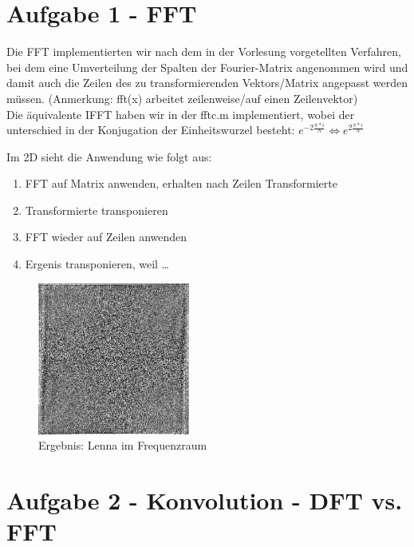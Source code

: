 



\newcommand{\nr}{2}
\lstset{language=matlab}


\section*{Aufgabe 1 - FFT}
Die FFT implementierten wir nach dem in der Vorlesung vorgetellten Verfahren,
bei dem eine Umverteilung der Spalten der Fourier-Matrix angenommen wird und
damit auch die Zeilen des zu transformierenden Vektors/Matrix angepasst werden
m\"ussen. (Anmerkung: fft(x) arbeitet zeilenweise/auf einen Zeilenvektor)\\


Die \"aquivalente IFFT haben wir in der fftc.m implementiert, wobei der
unterschied in der Konjugation der Einheitswurzel besteht: 
$e^{-2\frac{\pi*i}{N}} \Leftrightarrow e^{2\frac{\pi*i}{N}} $

Im 2D sieht die Anwendung wie folgt aus: 
\begin{enumerate}
\item FFT auf Matrix anwenden, erhalten nach Zeilen Transformierte
\item Transformierte transponieren
\item FFT wieder auf Zeilen anwenden
\item Ergenis transponieren, weil \ldots
\end{enumerate}


\begin{figure}[H]
\begin{center}
\includegraphics[width=50mm]{u02/f_out.eps}
\end{center}
\caption{Ergebnis: Lenna im Frequenzraum}
\end{figure}

\section*{Aufgabe 2 - Konvolution - DFT vs. FFT} 

